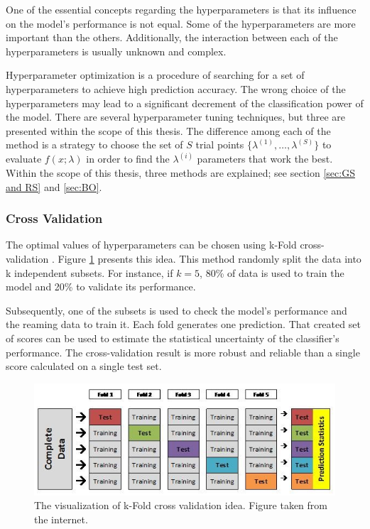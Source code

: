 One of the essential concepts regarding the hyperparameters is that its influence on the model's performance is not equal. Some of the hyperparameters are more important than the others. Additionally, the interaction between each of the hyperparameters is usually unknown and complex. 

Hyperparameter optimization is a procedure of searching for a set of hyperparameters to achieve high prediction accuracy. The wrong choice of the hyperparameters may lead to a significant decrement of the classification power of the model. There are several hyperparameter tuning techniques, but three are presented within the scope of this thesis. The difference among each of the method is a strategy to choose the set of $S$ trial points $\{\lambda^{(1)}, \ldots , \lambda^{(S)} \}$ to evaluate $f(x;\lambda)$ in order to find the $\lambda^{(i)}$ parameters that work the best. Within the scope of this thesis, three methods are explained; see section \ref{sec:GS and RS} and \ref{sec:BO}.  

\subsubsection{Cross Validation}
The optimal values of hyperparameters can be chosen using k-Fold cross-validation \cite{Statistical_Methods}. Figure \ref{fig:CV} presents this idea. This method randomly split the data into k independent subsets. For instance, if $k = 5$, 80\% of data is used to train the model and 20\% to validate its performance.   

Subsequently, one of the subsets is used to check the model's performance and the reaming data to train it. Each fold generates one prediction. That created set of scores can be used to estimate the statistical uncertainty of the classifier's performance. The cross-validation result is more robust and reliable than a single score calculated on a single test set.   

\begin{figure}[h]
\centering
\includegraphics{figures/CV.PNG}
\caption{ The visualization of k-Fold cross validation idea. Figure taken from the internet.
\label{fig:CV}}
\end{figure}

